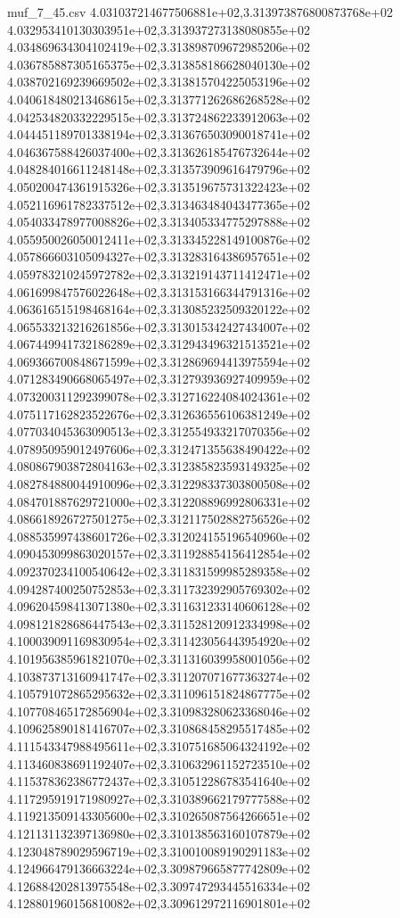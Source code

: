 \begin{filecontents*}{muf_7_45.csv}
4.031037214677506881e+02,3.313973876800873768e+02
4.032953410130303951e+02,3.313937273138080855e+02
4.034869634304102419e+02,3.313898709672985206e+02
4.036785887305165375e+02,3.313858186628040130e+02
4.038702169239669502e+02,3.313815704225053196e+02
4.040618480213468615e+02,3.313771262686268528e+02
4.042534820332229515e+02,3.313724862233912063e+02
4.044451189701338194e+02,3.313676503090018741e+02
4.046367588426037400e+02,3.313626185476732644e+02
4.048284016611248148e+02,3.313573909616479796e+02
4.050200474361915326e+02,3.313519675731322423e+02
4.052116961782337512e+02,3.313463484043477365e+02
4.054033478977008826e+02,3.313405334775297888e+02
4.055950026050012411e+02,3.313345228149100876e+02
4.057866603105094327e+02,3.313283164386957651e+02
4.059783210245972782e+02,3.313219143711412471e+02
4.061699847576022648e+02,3.313153166344791316e+02
4.063616515198468164e+02,3.313085232509320122e+02
4.065533213216261856e+02,3.313015342427434007e+02
4.067449941732186289e+02,3.312943496321513521e+02
4.069366700848671599e+02,3.312869694413975594e+02
4.071283490668065497e+02,3.312793936927409959e+02
4.073200311292399078e+02,3.312716224084024361e+02
4.075117162823522676e+02,3.312636556106381249e+02
4.077034045363090513e+02,3.312554933217070356e+02
4.078950959012497606e+02,3.312471355638490422e+02
4.080867903872804163e+02,3.312385823593149325e+02
4.082784880044910096e+02,3.312298337303800508e+02
4.084701887629721000e+02,3.312208896992806331e+02
4.086618926727501275e+02,3.312117502882756526e+02
4.088535997438601726e+02,3.312024155196540960e+02
4.090453099863020157e+02,3.311928854156412854e+02
4.092370234100540642e+02,3.311831599985289358e+02
4.094287400250752853e+02,3.311732392905769302e+02
4.096204598413071380e+02,3.311631233140606128e+02
4.098121828686447543e+02,3.311528120912334998e+02
4.100039091169830954e+02,3.311423056443954920e+02
4.101956385961821070e+02,3.311316039958001056e+02
4.103873713160941747e+02,3.311207071677363274e+02
4.105791072865295632e+02,3.311096151824867775e+02
4.107708465172856904e+02,3.310983280623368046e+02
4.109625890181416707e+02,3.310868458295517485e+02
4.111543347988495611e+02,3.310751685064324192e+02
4.113460838691192407e+02,3.310632961152723510e+02
4.115378362386772437e+02,3.310512286783541640e+02
4.117295919171980927e+02,3.310389662179777588e+02
4.119213509143305600e+02,3.310265087564266651e+02
4.121131132397136980e+02,3.310138563160107879e+02
4.123048789029596719e+02,3.310010089190291183e+02
4.124966479136663224e+02,3.309879665877742809e+02
4.126884202813975548e+02,3.309747293445516334e+02
4.128801960156810082e+02,3.309612972116901801e+02

\end{filecontents*}
